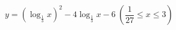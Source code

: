 $y=\left(\log_{\frac{1}{3}} x\right)^{2}-4\log_{\frac{1}{3}} x-6\ \left(\dfrac{1}{27}\le x\le 3\right)$
